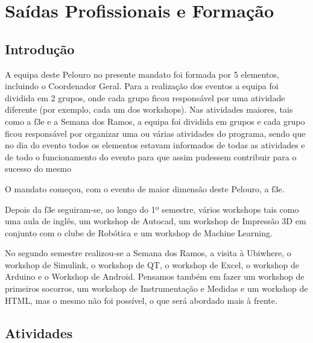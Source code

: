 
\section{Saídas Profissionais e Formação}

\subsection{Introdução}

A equipa deste Pelouro no presente mandato foi formada por 5 elementos, incluindo o Coordenador Geral. Para a realização dos eventos a equipa foi dividida em 2 grupos, onde cada grupo ficou responsável por uma atividade diferente (por exemplo, cada um dos workshops). Nas atividades maiores, tais como a \acrshort{f3e} e a Semana dos Ramos, a equipa foi dividida em grupos e cada grupo ficou responsável por organizar uma ou várias atividades do programa, sendo que no dia do evento todos os elementos estavam informados de todas as atividades e de todo o funcionamento do evento para que assim pudessem contribuir para o sucesso do mesmo

O mandato começou, com o evento de maior dimensão deste Pelouro, a \acrfull{f3e}.

Depois da \acrshort{f3e} seguiram-se, ao longo do 1º semestre, vários workshops tais como uma aula de inglês, um workshop de Autocad, um workshop de Impressão 3D em conjunto com o clube de Robótica e um workshop de Machine Learning.

No segundo semestre realizou-se a Semana dos Ramos, a visita à Ubiwhere, o workshop de Simulink, o workshop de QT, o workshop de Excel, o workshop de Arduino e o Workshop de Android. Pensamos também em fazer um workshop de primeiros socorros, um workshop de Instrumentação e Medidas e um workshop de HTML, mas o mesmo não foi possível, o que será abordado mais à frente.

\subsection{Atividades}







